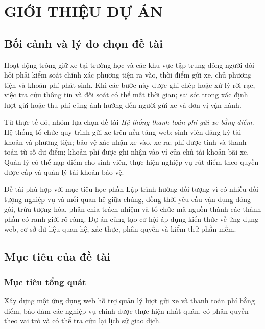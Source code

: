 \chapter{GIỚI THIỆU DỰ ÁN}

\section{Bối cảnh và lý do chọn đề tài}

Hoạt động trông giữ xe tại trường học và các khu vực tập trung đông người đòi hỏi phải kiểm soát chính xác phương tiện ra vào, thời điểm gửi xe, chủ phương tiện và khoản phí phát sinh. Khi các bước này được ghi chép hoặc xử lý rời rạc, việc tra cứu thông tin và đối soát có thể mất thời gian; sai sót trong xác định lượt gửi hoặc thu phí cũng ảnh hưởng đến người gửi xe và đơn vị vận hành.

Từ thực tế đó, nhóm lựa chọn đề tài \textit{Hệ thống thanh toán phí gửi xe bằng điểm}. Hệ thống tổ chức quy trình gửi xe trên nền tảng web: sinh viên đăng ký tài khoản và phương tiện; bảo vệ xác nhận xe vào, xe ra; phí được tính và thanh toán từ số dư điểm; khoản phí được ghi nhận vào ví của chủ tài khoản bãi xe. Quản lý có thể nạp điểm cho sinh viên, thực hiện nghiệp vụ rút điểm theo quyền được cấp và quản lý tài khoản bảo vệ.

Đề tài phù hợp với mục tiêu học phần Lập trình hướng đối tượng vì có nhiều đối tượng nghiệp vụ và mối quan hệ giữa chúng, đồng thời yêu cầu vận dụng đóng gói, trừu tượng hóa, phân chia trách nhiệm và tổ chức mã nguồn thành các thành phần có ranh giới rõ ràng. Dự án cũng tạo cơ hội áp dụng kiến thức về ứng dụng web, cơ sở dữ liệu quan hệ, xác thực, phân quyền và kiểm thử phần mềm.

\section{Mục tiêu của đề tài}

\subsection{Mục tiêu tổng quát}
Xây dựng một ứng dụng web hỗ trợ quản lý lượt gửi xe và thanh toán phí bằng điểm, bảo đảm các nghiệp vụ chính được thực hiện nhất quán, có phân quyền theo vai trò và có thể tra cứu lại lịch sử giao dịch.

